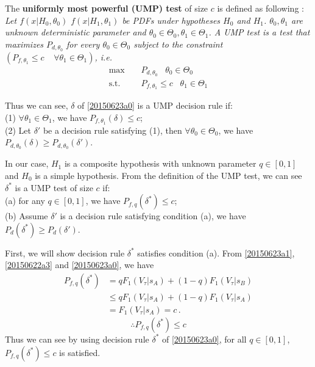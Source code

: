  The \textbf{uniformly most powerful (UMP) test} of size $c$ is defined as following \cite{LehmannTest, poor1994introduction, casella2002statistical}:
\textit{
  Let $f(x|H_0, \theta_0)$ $f(x|H_1, \theta_1)$ be PDFs under hypotheses $H_0$ and $H_1$. $\theta_0, \theta_1$ are unknown deterministic parameter and $\theta_0 \in \Theta_0, \theta_1 \in \Theta_1$. A UMP test is a test that maximizes $P_{d, \theta_0}$ for every  $\theta_0 \in \Theta_0$ subject to the constraint $(P_{f,\theta_1} \leq c\;\;\;\;\forall \theta_1 \in \Theta_1)$, i.e. }
\begin{equation}
  \begin{split}
    \max\;\;\;\;&P_{d, \theta_0}\;\;\;\theta_0 \in \Theta_0\\
    \text{s.t.}\;\;\;\;&P_{f, \theta_1} \leq c\;\;\;\theta_1 \in \Theta_1
  \end{split}
\end{equation}

Thus we can see,  $\delta$ of \eqref{20150623a0}  is a UMP decision rule if: 
  \\(1) $\forall \theta_1 \in \Theta_1$, we have $P_{f, \theta_1}(\delta) \leq c$;
  \\(2) Let $\delta'$ be a decision rule satisfying (1), then  $\forall \theta_0 \in \Theta_0$, we have $P_{d,\theta_0}(\delta) \geq P_{d, \theta_0}(\delta')$. 

In our case, $H_1$ is a composite hypothesis with unknown parameter $q \in [0, 1]$ and $H_0$ is a simple hypothesis. From the definition of the UMP test,  we can see $\delta^\ast$ is a UMP test of size $c$ if:
\\(a) for any $q \in [0, 1]$, we have $P_{f,q}(\delta^\ast) \leq c$;
\\(b) Assume $\delta'$ is a decision rule satisfying condition (a), we have $P_d(\delta^\ast) \geq P_d(\delta')$.  

First, we will show decision rule $\delta^\ast$ satisfies condition (a). From \eqref{20150623a1}, \eqref{20150622a3} and \eqref{20150623a0}, we have 
\begin{equation}
  \begin{split}
    P_{f,q}(\delta^\ast) &= qF_1(V_\tau|s_A) + (1-q)F_1(V_\tau|s_B)\\
    &\leq qF_1(V_\tau|s_A) + (1-q)F_1(V_\tau|s_A)\\
    &= F_1(V_\tau|s_A) = c\,.
  \end{split}
\end{equation}
\begin{equation}
  \therefore P_{f,q}(\delta^\ast) \leq c
  \label{20150705a1}
\end{equation}
Thus we can see by using decision rule $\delta^\ast$ of \eqref{20150623a0}, for all $q \in [0, 1]$, $P_{f,q}(\delta^\ast) \leq c$ is satisfied.

